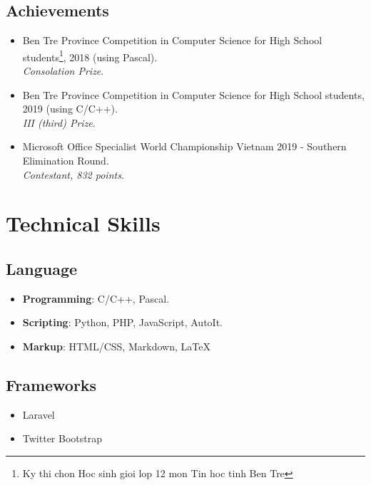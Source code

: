 \documentclass{article}
\begin{document}
        \subsection{Achievements}
            \begin{itemize}
                \item {Ben Tre Province Competition in Computer Science for High School students\footnote{Ky thi chon Hoc sinh gioi lop 12 mon Tin hoc tinh Ben Tre}, 2018 (using Pascal)}.\\
                \textit{Consolation Prize}.

                \item {Ben Tre Province Competition in Computer Science for High School students, 2019 (using C/C++)}.\\
                \textit{III (third) Prize}.

                \item {Microsoft Office Specialist World Championship Vietnam 2019 - Southern Elimination Round}.\\
                \textit{Contestant, 832 points}.
            \end{itemize}

    \section{Technical Skills}
        \subsection{Language}
        \begin{itemize}
            \item \textbf{Programming}: C/C++, Pascal.
            \item \textbf{Scripting}: Python, PHP, JavaScript, AutoIt.
            \item \textbf{Markup}: HTML/CSS, Markdown, \LaTeX
        \end{itemize}

        \subsection{Frameworks}
        \begin{itemize}
            \item Laravel\cite{laravel}
            \item Twitter Bootstrap\cite{bootstrap}
        \end{itemize}
\end{document}
